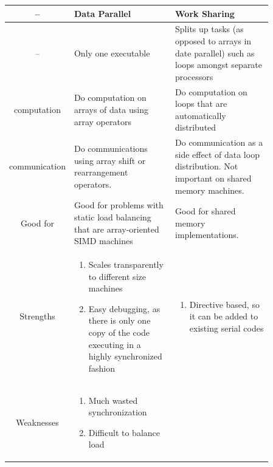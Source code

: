 \documentclass[12pt, a4paper]{book}
\begin{document}
\begin{longtable}{|c|p{0.43\linewidth}|p{0.43\linewidth}|}
    \hline
    --            & \textbf{Data Parallel}                                                                                 & \textbf{Work Sharing}                                                                                 \\
    \hline
    --            & Only one executable                                                                                    & Splits up tasks (as opposed to arrays in date parallel) such as loops amongst separate processors     \\
    \hline
    computation   & Do computation on arrays of data using array operators                                                 & Do computation on loops that are automatically distributed                                            \\
    \hline
    communication & Do communications using array shift or rearrangement operators.                                        & Do communication as a side effect of data loop distribution. Not important on shared memory machines. \\
    \hline
    Good for      & Good for problems with static load balancing that are array-oriented SIMD machines                     & Good for shared memory implementations.                                                               \\
    \hline
    Strengths     & \begin{enumerate}
                        \item Scales transparently to different size machines
                        \item Easy debugging, as there is only one copy of the code executing in a highly synchronized fashion
                    \end{enumerate} & \begin{enumerate}
                                          \item Directive based, so it can be added to existing serial codes
                                      \end{enumerate}                                                                                                          \\
    \hline
    Weaknesses    & \begin{enumerate}
                        \item Much wasted synchronization
                        \item Difficult to balance load

\end{enumerate}
\end{longtable}
\end{document}
